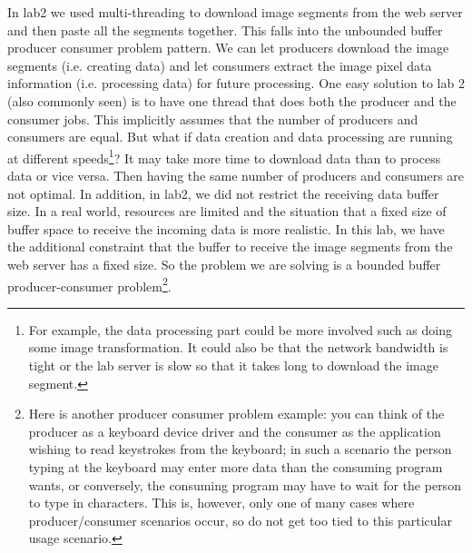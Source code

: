 In lab2 we used multi-threading to download image segments from the web server and then paste all the segments together. This falls into the unbounded buffer producer consumer problem pattern. We can let producers download the image segments (i.e. creating data) and let consumers extract the image pixel data information (i.e. processing data) for future processing. One easy solution to lab 2 (also commonly seen) is to have one thread that does both the producer and the consumer jobs. This implicitly assumes that the number of producers and consumers are equal. But what if data creation and data processing are running at different speeds\footnote{For example, the data processing part could be more involved such as doing some image transformation. It could also be that the network bandwidth is tight or the lab server is slow so that it takes long to download the image segment.}? It may take more time to download data than to process data or vice versa. Then having the same number of producers and consumers are not optimal. In addition, in lab2, we did not restrict the receiving data buffer size. In a real world, resources are limited and the situation that a fixed size of buffer space to receive the incoming data is more realistic. In this lab, we have the additional constraint that the buffer to receive the image segments from the web server has a fixed size. So the problem we are solving is a bounded buffer producer-consumer problem\footnote{Here is another producer consumer problem example: you can think of the producer as a keyboard device driver and the consumer as the application wishing to read keystrokes from the keyboard; in such a scenario the person typing at the keyboard may enter more data than the consuming  program wants, or conversely, the consuming program may have to wait  for the person to type in characters. This is, however, only one of many cases where producer/consumer scenarios occur, so do not get too tied to this particular usage scenario.}.




